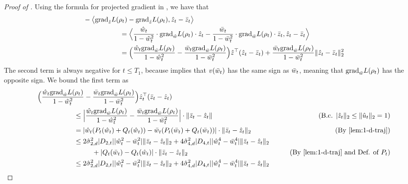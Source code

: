 \begin{proof}[Proof of ]
    Using the formula for projected gradient in , we have that
    \begin{align}
        &- \big\langle {\textup{grad}}_{\hat{z}} L(\rho_t)  - {\textup{grad}}_{\bar{z}} L(\rho_t), \hat{z}_t - \bar{z}_t\big\rangle \\
        & \,\,\,\,\,\,\,\,\,\,\,\,\,\,\,\,\,\,\,\,\,\,\,\,\,\,\,\,\,\,\,\, = \Big\langle \frac{\hat{w}_t}{1-\hat{w}_t^2}\cdot {\textup{grad}}_{\hat{w}} L(\rho_t)\cdot \hat{z}_t - \frac{\bar{w}_t}{1-\bar{w}_t^2}\cdot {\textup{grad}}_{\bar{w}} L(\rho_t)\cdot \bar{z}_t,  \hat{z}_t - \bar{z}_t\Big\rangle \\
        & \,\,\,\,\,\,\,\,\,\,\,\,\,\,\,\,\,\,\,\,\,\,\,\,\,\,\,\,\,\,\,\, = \Big(\frac{\hat{w}_t {\textup{grad}}_{\hat{w}} L(\rho_t)}{1 - \hat{w}_t^2} - \frac{\bar{w}_t {\textup{grad}}_{\bar{w}} L(\rho_t)}{1 - \bar{w}_t^2}\Big) \hat{z}^\top (\hat{z}_t - \bar{z}_t) + \frac{\bar{w}_t {\textup{grad}}_{\bar{w}} L(\rho_t)}{1 - \bar{w}_t^2} \|\hat{z}_t - \bar{z}_t\|_2^2
    \end{align}
    The second term is always negative for $t \leq T_1$, because  implies that $v(\bar{w}_t)$ has the same sign as $\bar{w}_t$, meaning that ${\textup{grad}}_{\bar{w}} L(\rho_t)$ has the opposite sign. We bound the first term as    
    \begin{align}
    &\Big( \frac{\what_t\pgrad_{\what} L(\rho_t)}{1-\what_t^2} - \frac{\wbar_t \pgrad_{\wbar} L(\rho_t)}{1-\wbar_t^2}\Big) \zhat_t^\top (\zbar_t-\zhat_t) \\
    & \nextlinespace\nextlinespace \le \Big|  \frac{\what_t\pgrad_{\what} L(\rho_t)}{1-\what_t^2} - \frac{\wbar_t \pgrad_{\wbar} L(\rho_t)}{1-\wbar_t^2}\Big| \cdot \norm{\zbar_t-\zhat_t} 
    & \tag{B.c. $|\zhat_t\|_2 \leq \|\uhat_t\|_2 = 1$} \\
    & \nextlinespace\nextlinespace = |\what_t (P_t(\what_t) + Q_t(\what_t)) - \wbar_t (P_t(\wbar_t) + Q_t(\wbar_t)) | \cdot \|\zbar_t - \zhat_t\|_2
    & \tag{By \Cref{lem:1-d-traj}} \\
    & \nextlinespace\nextlinespace \leq 2 \sigmaCoeffTwo^2 |D_{2, t}| |\what_t^2 - \wbar_t^2| \|\zbar_t - \zhat_t\|_2 + 4 \sigmaCoeffFour^2 |D_{4, t}| |\what_t^4 - \wbar_t^4 | \|\zbar_t - \zhat_t\|_2 \\
    & \nextlinespace\nextlinespace\nextlinespace + |Q_t(\wbar_t) - Q_t(\what_t)| \cdot \|\zbar_t - \zhat_t\|_2
    & \tag{By \Cref{lem:1-d-traj} and Def. of $P_t$} \\
    & \nextlinespace\nextlinespace \leq 2 \sigmaCoeffTwo^2 |D_{2, t}| |\what_t^2 - \wbar_t^2| \|\zbar_t - \zhat_t\|_2 + 4 \sigmaCoeffFour^2 |D_{4, t}| |\what_t^4 - \wbar_t^4 | \|\zbar_t - \zhat_t\|_2 \\

\end{align}
\end{proof}
